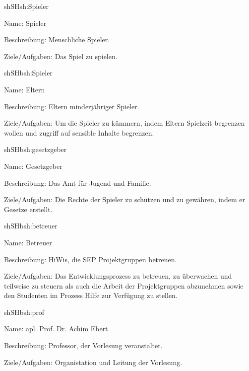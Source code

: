 \begin{description}[leftmargin=5em, style=sameline]
	
	\begin{lhp}{sh}{SH}{sh:Spieler}
		\item [Name:] Spieler
		\item [Beschreibung:] Menschliche Spieler.
		\item [Ziele/Aufgaben:] Das Spiel zu spielen.
	\end{lhp}
	
	\begin{lhp}{sh}{SH}{bsh:Spieler}
		\item [Name:] Eltern
		\item [Beschreibung:] Eltern minderjähriger Spieler.
		\item [Ziele/Aufgaben:] Um die Spieler zu kümmern, indem Eltern Spielzeit begrenzen wollen und zugriff auf sensible Inhalte begrenzen.
	\end{lhp}
	
	\begin{lhp}{sh}{SH}{bsh:gesetzgeber}
		\item [Name:] Gesetzgeber
		\item [Beschreibung:] Das Amt für Jugend und Familie.
		\item [Ziele/Aufgaben:] Die Rechte der Spieler zu schützen und zu gewähren, indem er Gesetze erstellt.
	\end{lhp}
	
	\begin{lhp}{sh}{SH}{bsh:betreuer}
		\item [Name:] Betreuer
		\item [Beschreibung:] HiWis, die SEP Projektgruppen betreuen.
		\item [Ziele/Aufgaben:] Das Entwicklungsprozess zu betreuen, zu überwachen und teilweise zu steuern als auch die Arbeit der Projektgruppen abzunehmen sowie den Studenten im Prozess Hilfe zur Verfügung zu stellen. 
	\end{lhp}
	
	\begin{lhp}{sh}{SH}{bsh:prof}
		\item [Name:] apl. Prof. Dr. Achim Ebert
		\item [Beschreibung:]  Professor, der Vorlesung veranstaltet.
		\item [Ziele/Aufgaben:]  Organistation und Leitung der Vorlesung.
	\end{lhp}
		
\end{description}

